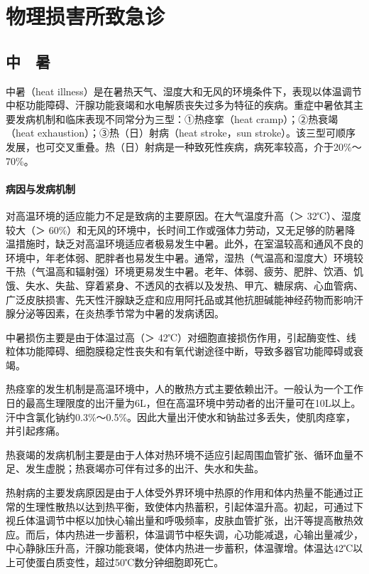 \part{物理损害所致急诊}

\chapter{中　暑}

中暑（heat
illness）是在暑热天气、湿度大和无风的环境条件下，表现以体温调节中枢功能障碍、汗腺功能衰竭和水电解质丧失过多为特征的疾病。重症中暑依其主要发病机制和临床表现不同常分为三型：①热痉挛（heat
cramp）；②热衰竭（heat exhaustion）；③热（日）射病（heat stroke，sun
stroke）。该三型可顺序发展，也可交叉重叠。热（日）射病是一种致死性疾病，病死率较高，介于20\%～70\%。

\subsection{病因与发病机制}

对高温环境的适应能力不足是致病的主要原因。在大气温度升高（＞
32℃）、湿度较大（＞
60\%）和无风的环境中，长时间工作或强体力劳动，又无足够的防暑降温措施时，缺乏对高温环境适应者极易发生中暑。此外，在室温较高和通风不良的环境中，年老体弱、肥胖者也易发生中暑。通常，湿热（气温高和湿度大）环境较干热（气温高和辐射强）环境更易发生中暑。老年、体弱、疲劳、肥胖、饮酒、饥饿、失水、失盐、穿着紧身、不透风的衣裤以及发热、甲亢、糖尿病、心血管病、广泛皮肤损害、先天性汗腺缺乏症和应用阿托品或其他抗胆碱能神经药物而影响汗腺分泌等因素，在炎热季节常为中暑的发病诱因。

中暑损伤主要是由于体温过高（＞
42℃）对细胞直接损伤作用，引起酶变性、线粒体功能障碍、细胞膜稳定性丧失和有氧代谢途径中断，导致多器官功能障碍或衰竭。

热痉挛的发生机制是高温环境中，人的散热方式主要依赖出汗。一般认为一个工作日的最高生理限度的出汗量为6L，但在高温环境中劳动者的出汗量可在10L以上。汗中含氯化钠约0.3\%～0.5\%。因此大量出汗使水和钠盐过多丢失，使肌肉痉挛，并引起疼痛。

热衰竭的发病机制主要是由于人体对热环境不适应引起周围血管扩张、循环血量不足、发生虚脱；热衰竭亦可伴有过多的出汗、失水和失盐。

热射病的主要发病原因是由于人体受外界环境中热原的作用和体内热量不能通过正常的生理性散热以达到热平衡，致使体内热蓄积，引起体温升高。初起，可通过下视丘体温调节中枢以加快心输出量和呼吸频率，皮肤血管扩张，出汗等提高散热效应。而后，体内热进一步蓄积，体温调节中枢失调，心功能减退，心输出量减少，中心静脉压升高，汗腺功能衰竭，使体内热进一步蓄积，体温骤增。体温达42℃以上可使蛋白质变性，超过50℃数分钟细胞即死亡。

